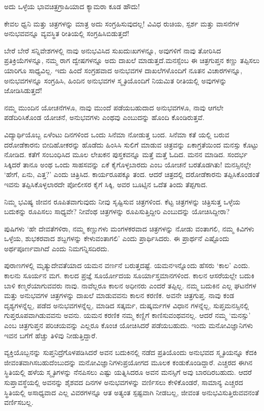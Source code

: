 ಅದು ಒಳ್ಳೆಯ ಭಾವಚಿತ್ರಗ್ರಾಹಿಯಾದ ಕ್ಯಾಮರಾ ಕೂಡ ಹೌದು!

ಕೇವಲ ಧ್ವನಿ ಮತ್ತು ಚಿತ್ರಗಳನ್ನು ಮಾತ್ರ ಅದು ಸಂಗ್ರಹಿಸುವುದಲ್ಲ! ವಿವಿಧ ರುಚಿಯ, ಸ್ಪರ್ಶ ಮತ್ತು ವಾಸನೆಗಳ ಅನುಭವವನ್ನೂ ವ್ಯವಸ್ಥಿತ ರೀತಿಯಲ್ಲಿ ಸಂಗ್ರಹಿಸಿಬಿಡುತ್ತದೆ!

ಬೇರೆ ಬೇರೆ ಸನ್ನಿವೇಶಗಳಲ್ಲಿ ನಾವು ಅನುಭವಿಸಿದ ಸುಖದುಃಖಗಳನ್ನೂ, ಅವುಗಳಿಗೆ ನಾವು ತೋರಿಸಿದ ಪ್ರತಿಕ್ರಿಯೆಗಳನ್ನೂ, ನಮ್ಮ ರಾಗ ದ್ವೇಷಗಳನ್ನೂ ಅದು ದಾಖಲೆ ಮಾಡುತ್ತದೆ.\break ಮನಸ್ಸೆಂಬ ಈ ಚಿತ್ರಗುಪ್ತನ ಕಣ್ಣು ತಪ್ಪಿಸಲು ಯಾರಿಗೂ ಸಾಧ್ಯವಿಲ್ಲ. ಇದು ಹಿಂದೆ ಸಂಗ್ರಹವಾದ ಅನುಭವಗಳ ದಾಖಲೆಗಳೊಂದಿಗೆ ನೂತನ ವಿಚಾರಗಳನ್ನೂ, ಅನುಭವಗಳನ್ನೂ ಸಂಗ್ರಹಿಸಿ, ಹಿಂದಿನ ಅನುಭವಗಳ ಸ್ಮೃತಿಯೊಂದಿಗೆ ನಿಯಮಿತ ರೀತಿಯಲ್ಲಿ ಅವುಗಳನ್ನು ಜೋಡಿಸಿಡುತ್ತದೆ!

ನಮ್ಮ ಮುಂದಿನ ಯೋಚನೆಗಳೂ, ನಾವು ಮುಂದೆ ಪಡೆಯಬಹುದಾದ ಅನುಭವಗಳೂ, ನಾವು ಆಗಲೇ ಪಡೆದಿರಿಸಿಕೊಂಡ ಯೋಚನೆ, ಅನುಭವಗಳು ಎಂಥವು ಎಂಬುದನ್ನು ಹೊಂದಿ ಕೊಂಡಿರುತ್ತವೆ.

ವಿದ್ಯಾರ್ಥಿಯೊಬ್ಬ ಏಳೆಂಟು ದಿನಗಳಿಂದ ಒಂದು ಸಿನೆಮಾ ನೋಡುತ್ತ ಬಂದ. ಸಿನೆಮಾ ಕತೆ ಯಲ್ಲಿ ಬರುವ ದರೋಡೆಕಾರನು ಬೀದಿಹೋಕರನ್ನು ಹೊಡೆದು ಹಿಂಸಿಸಿ ಸುಲಿಗೆ ಮಾಡುವ ಚಿತ್ರವನ್ನು ಏಕಾಗ್ರತೆಯಿಂದ ಮನಸ್ಸು ಕೊಟ್ಟು ನೋಡಿದ. ಕತೆಗೆ ಸಂಬಂಧಿಸಿದ ಮೂಲ ಲೇಖಕನ ಪುಸ್ತಕವನ್ನೂ ಮತ್ತೆ ಮತ್ತೆ ಓದಿದ. ಮನನ ಮಾಡಿದ. ಸಂದರ್ಭ ಸಿಕ್ಕಿದರೆ ತಾನೂ ಅಂಥ ಒಂದು ಸಾಹಸವನ್ನು ಏಕೆ ಕೈಗೊಳ್ಳಬಾರದು ಎಂಬ ಯೋಚನೆ ಬರತೊಡಗಿತು! ಮನಸ್ಸಿನಲ್ಲೇ ‘ಹೇಗೆ, ಏನು, ಎತ್ತ?’ ಎಂದು ಚಿತ್ರಿಸಿದ. ಕಾರ್ಯರೂಪಕ್ಕೂ ತಂದ. ಆದರೆ ಚಿತ್ರದಲ್ಲಿ ದರೋಡೆಕಾರನು ತಪ್ಪಿಸಿಕೊಂಡಂತೆ ಇವನು ತಪ್ಪಿಸಿಕೊಳ್ಳಲಾರದೇ ಪೋಲೀಸರ ಕೈಗೆ ಸಿಕ್ಕಿ, ಅವರ ಬೂಟ್ಸಿನ ಒದೆತ ತಿಂದು ತೆಪ್ಪಗಾದ.

ನಿಮ್ಮ ಭವಿಷ್ಯ ಜೀವನ ರೂಪಿತವಾಗುವುದು ನೀವು ಸೃಷ್ಟಿಸುವ ಚಿತ್ರಗಳಿಂದ. ಕೆಟ್ಟ ಚಿತ್ರಗಳನ್ನು ಚಿತ್ರಿಸುತ್ತ ಒಳ್ಳೆಯ ಬದುಕನ್ನು ರೂಪಿಸಲು ಸಾಧ್ಯವೇ? ನೀವೆಂಥ ಚಿತ್ರಗಳನ್ನು ರೂಪಿಸುತ್ತಿದ್ದೀರಿ ಎಂಬುದನ್ನು ಯೋಚಿಸಿದ್ದೀರಾ?

ಪುಷಿಗಳು ‘ಹೇ ದೇವತೆಗಳಿರಾ, ನಮ್ಮ ಕಣ್ಣುಗಳು ಮಂಗಳಕರವಾದ ಚಿತ್ರಗಳನ್ನು ನೋಡು ವಂತಾಗಲಿ, ನಮ್ಮ ಕಿವಿಗಳು ಒಳ್ಳೆಯ, ಶುಭಕರವಾದ ಶಬ್ದಗಳನ್ನು ಕೇಳುವಂತಾಗಲಿ’ ಎಂದು ಪ್ರಾರ್ಥಿಸಿದರು. ಈ ಪ್ರಾರ್ಥನೆ ಎಷ್ಟೊಂದು ಅರ್ಥಪೂರ್ಣವಾಗಿದೆ ಎಂದು ನಿಮಗನ್ನಿಸದಿರದು.

ಪುರಾಣಗಳಲ್ಲಿ ಮೃತ್ಯುದೇವತೆಯಾದ ಯಮನ ವರ್ಣನೆ ಬರುತ್ತದಷ್ಟೆ. ಯಮನ\break ಇನ್ನೊಂದು ಹೆಸರು ‘ಕಾಲ’ ಎಂದು. ಕಾಲನು ಸೂರ್ಯನ ಮಗ. ಕಾಲದ ಪ್ರಜ್ಞೆ ಸೂರ್ಯೋದಯ ಸೂರ್ಯಾಸ್ತಮಾನಗಳಿಂದ. ಕಾಲನ ಆಸರೆಯಲ್ಲೇ ಬದುಕಿ ಬಾಳಿ ಕಣ್ಮರೆಯಾಗುವವರು ನಾವು. ನಾವೆಲ್ಲರೂ ಕಾಲನ ಅಧೀನರು ಎಂದರೆ ತಪ್ಪಿಲ್ಲ. ನಮ್ಮ ಬದುಕಿನ ಎಲ್ಲ ಘಟನೆಗಳ ಮತ್ತು ಅನುಭವಗಳ ಚಿತ್ರಗಳನ್ನು ದಾಖಲೆ ಮಾಡುವವನು ಕಾಲನ ಕರಣಿಕ. ಅವನೇ ಚಿತ್ರಗುಪ್ತ. ನಾವು ಕಂಡ ದೃಶ್ಯಗಳನ್ನೆಲ್ಲ, ಪಡೆದ ಅನುಭವಗಳನ್ನೆಲ್ಲ, ಮಾಡಿದ ಸತ್ಕರ್ಮ, ದುಷ್ಕರ್ಮಗಳ ವಿಧಾನ ಗಳನ್ನೆಲ್ಲ, ಸುಪ್ತಮನಸ್ಸಿನಲ್ಲಿ ಗುಪ್ತರೂಪವಾಗಿಡುವವನು ಅವನು. ಯಮನ ಕರಣಿಕ ನಮ್ಮ ಕಣ್ಣಿಗೆ ಕಾಣಿಸುವಂಥವನಲ್ಲ. ಆದರೆ ನಮ್ಮ ‘ಮನಸ್ಸು’ ಎಂಬ ಚಿತ್ರಗುಪ್ತನ ಪರಿಚಯವನ್ನು ಎಲ್ಲರೂ ಕೊಂಚ ಯೋಚಿಸಿದರೆ ಪಡೆಯಬಹುದು. ಇಂದು ಮನೋವಿಜ್ಞಾನಿಗಳು ಇವನ ಬಗೆಗೆ ಹೆಚ್ಚು ತಿಳಿವು ನೀಡುತ್ತಿದ್ದಾರೆ.

ವ್ಯಕ್ತಿಯೊಬ್ಬನನ್ನು ಸುಪ್ತನಿದ್ರೆಗೊಳಪಡಿಸಿದರೆ ಅವನ ಬದುಕಿನಲ್ಲಿ ನಡೆದ ಪ್ರತಿಯೊಂದು ಅನುಭವದ ಸ್ಮೃತಿಯನ್ನೂ ಕೆದಕಿ ಜೀವಂತವಾಗಿಸಬಹುದೆಂಬುದನ್ನು ಮನೋವಿಜ್ಞಾನಿಗಳು\break ಪ್ರಯೋಗದ ಮೂಲಕ ಕಂಡುಕೊಂಡಿದ್ದಾರೆ. ಎಚ್ಚರದ ಈಗಿನ ಸ್ಥಿತಿಯಲ್ಲಿ ಹಳೆಯ ಸ್ಮೃತಿಗಳನ್ನು ನೆನಪಿಸಲು ಎಷ್ಟು ಯತ್ನಿಸಿದರೂ ಅವನ ಮನಸ್ಸಿಗೆ ಅವು ಬಾರದಿರಬಹುದು. ಆದರೆ ಸುಪ್ತಾವಸ್ಥೆಯಲ್ಲಿ ಅವನನ್ನು ಶೈಶವದ ದಿನಗಳ ಅನುಭವಗಳನ್ನು ವರ್ಣಿಸಲು ಕೇಳಿಕೊಂಡರೆ, ಸಾಮಾನ್ಯ ಎಚ್ಚರದ ಸ್ಥಿತಿಯಲ್ಲಿ ಅಸಾಧ್ಯವಾದ ಎಲ್ಲ ವಿವರಗಳನ್ನೂ ಆತ ಅತ್ಯಂತ ಸ್ಪಷ್ಟವಾಗಿ ನೀಡಬಲ್ಲ, ಜೀವಂತ ಅನುಭವಿಸುತ್ತಿರುವವನಂತೆ ವರ್ಣಿಸಬಲ್ಲ.

